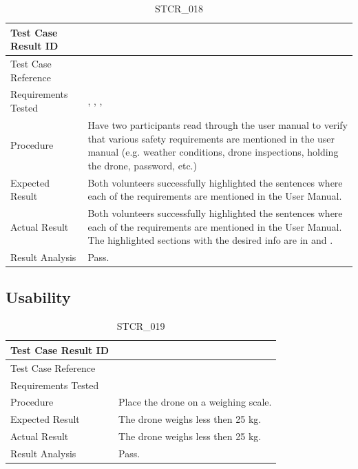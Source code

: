 \documentclass[12pt, titlepage]{article}
\begin{document}
\begin{table}[!h]
\begin{center}
\caption {STCR\_018}
\label{tab:STCR_018}
\begin{tabular}{ | m{3.2cm} | m{12.2cm} | } 
\hline
Test Case Result ID & \nameref{tab:STCR_018} \\ 
\hline
Test Case Reference & \nameref{tab:STC_018}  \\ 
\hline
Requirements Tested &\nameref{SR_002}, \nameref{SR_006}, \nameref{SR_010}, \nameref{SAFE_003} \\ 
\hline
Procedure & Have two participants read through the user manual to verify that various safety requirements are mentioned in the user manual (e.g. weather conditions, drone inspections, holding the drone, password, etc.) \\
\hline
Expected Result & Both volunteers successfully highlighted the sentences where each of the requirements are mentioned in the User Manual.  \\ 
\hline
Actual Result &  Both volunteers successfully highlighted the sentences where each of the requirements are mentioned in the User Manual. The highlighted sections with the desired info are in \nameref{sec:umChecklist} and \nameref{sec:umSafety}.  \\
\hline
Result Analysis & Pass.  \\ 
\hline
\end{tabular}
\end{center}
\end{table}

\clearpage

\subsection{Usability}

\begin{table}[!h]
\begin{center}
\caption {STCR\_019}
\label{tab:STCR_019}
\begin{tabular}{ | m{3.2cm} | m{12.2cm} | } 
\hline
Test Case Result ID & \nameref{tab:STCR_019} \\ 
\hline
Test Case Reference & \nameref{tab:STC_019}  \\ 
\hline
Requirements Tested & \nameref{STD_001}
 \\ 
\hline
Procedure & Place the drone on a weighing scale. \\
\hline
Expected Result & The drone weighs less then 25 kg.  \\ 
\hline
Actual Result &  The drone weighs less then 25 kg.  \\
\hline
Result Analysis & Pass.  \\ 
\hline
\end{tabular}
\end{center}
\end{table}
\end{document}
